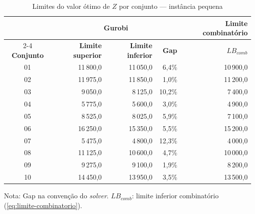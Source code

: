 \begin{table}[htbp]
    \caption{Limites do valor ótimo de $Z$ por conjunto --- instância pequena}
    \label{tab:res-limites-pequeno}
    \centering
    \begin{tabular}{crrrr}
        \hline
        & \multicolumn{3}{c}{\textbf{Gurobi}} & \textbf{Limite combinatório} \\
        \cline{2-4} \cline{5-5}
        \textbf{Conjunto} & \textbf{Limite superior} & \textbf{Limite inferior} & \textbf{Gap} & \textbf{$LB_{comb}$} \\
        \hline
        01 & 11\,800,0 & 11\,050,0 & 6,4\% & 10\,900,0 \\
        02 & 11\,975,0 & 11\,850,0 & 1,0\% & 11\,200,0 \\
        03 & 9\,050,0 & 8\,125,0 & 10,2\% & 7\,400,0 \\
        04 & 5\,775,0 & 5\,600,0 & 3,0\% & 4\,900,0 \\
        05 & 8\,525,0 & 8\,025,0 & 5,9\% & 7\,100,0 \\
        06 & 16\,250,0 & 15\,350,0 & 5,5\% & 15\,200,0 \\
        07 & 5\,475,0 & 4\,800,0 & 12,3\% & 4\,000,0 \\
        08 & 11\,125,0 & 10\,600,0 & 4,7\% & 10\,000,0 \\
        09 & 9\,275,0 & 9\,100,0 & 1,9\% & 8\,200,0 \\
        10 & 14\,450,0 & 13\,950,0 & 3,5\% & 13\,500,0 \\
        \hline
    \end{tabular}
    \par\smallskip
    {\footnotesize Nota: Gap na convenção do \textit{solver}. $LB_{comb}$: limite inferior combinatório (\autoref{eq:limite-combinatorio}).}
\end{table}

